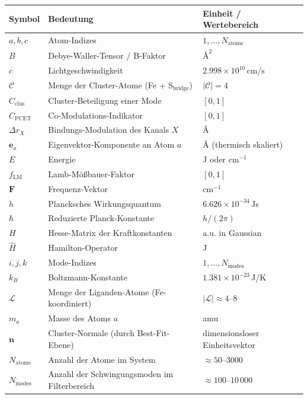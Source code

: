 \documentclass[11pt,a4paper,twoside]{article}
\providecommand{\angstrom}{\text{\AA}}    %
\theoremstyle{remark}
\begin{document}
\begin{tabular}{p{1.5cm} p{6cm} p{4cm}}
  \toprule
  \textbf{Symbol} & \textbf{Bedeutung} & \textbf{Einheit / Wertebereich} \\
  \midrule
  $a, b, c$       & Atom-Indizes        & $1, \ldots, N_\text{atoms}$ \\
  $B$             & Debye-Waller-Tensor / B-Faktor & $\angstrom^2$ \\
  $c$             & Lichtgeschwindigkeit & $2.998 \times 10^{10}$\,cm/s \\
  $\mathcal{C}$   & Menge der Cluster-Atome (Fe + S$_\text{bridge}$) & $|\mathcal{C}| = 4$ \\
  $C_\text{clus}$ & Cluster-Beteiligung einer Mode & $[0, 1]$ \\
  $C_\text{PCET}$ & Co-Modulations-Indikator & $[0, 1]$ \\
  $\Delta r_X$    & Bindungs-Modulation des Kanals $X$ & $\angstrom$ \\
  $\mathbf{e}_a$  & Eigenvektor-Komponente an Atom $a$ & $\angstrom$ (thermisch skaliert) \\
  $E$             & Energie & J oder cm$^{-1}$ \\
  $f_\text{LM}$   & Lamb-M\"o{\ss}bauer-Faktor & $[0, 1]$ \\
  $\mathbf{F}$    & Frequenz-Vektor & cm$^{-1}$ \\
  $h$             & Plancksches Wirkungsquantum & $6.626 \times 10^{-34}$\,Js \\
  $\hbar$         & Reduzierte Planck-Konstante & $h/(2\pi)$ \\
  $H$             & Hesse-Matrix der Kraftkonstanten & $\text{a.u.}$ in Gaussian \\
  $\hat{H}$       & Hamilton-Operator & J \\
  $i, j, k$       & Mode-Indizes        & $1, \ldots, N_\text{modes}$ \\
  $k_B$           & Boltzmann-Konstante & $1.381 \times 10^{-23}$\,J/K \\
  $\mathcal{L}$   & Menge der Liganden-Atome (Fe-koordiniert) & $|\mathcal{L}| \approx 4$--$8$ \\
  $m_a$           & Masse des Atoms $a$ & amu \\
  $\mathbf{n}$    & Cluster-Normale (durch Best-Fit-Ebene) & dimensionsloser Einheitsvektor \\
  $N_\text{atoms}$ & Anzahl der Atome im System & $\approx 50$--$3000$ \\
  $N_\text{modes}$ & Anzahl der Schwingungsmoden im Filterbereich & $\approx 100$--$10\,000$ \\

\end{tabular}
\end{document}
